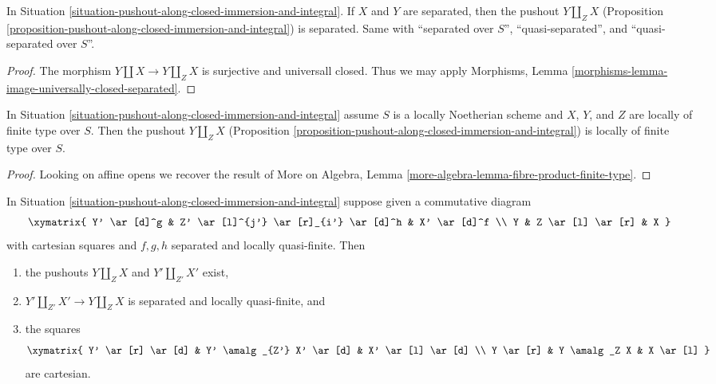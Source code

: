 \begin{lemma}
\label{lemma-pushout-separated}
In Situation \ref{situation-pushout-along-closed-immersion-and-integral}.
If $X$ and $Y$ are separated, then the pushout $Y \amalg_Z X$
(Proposition \ref{proposition-pushout-along-closed-immersion-and-integral})
is separated. Same with ``separated over $S$'', ``quasi-separated'', and
``quasi-separated over $S$''.
\end{lemma}

\begin{proof}
The morphism $Y \amalg X \to Y \amalg_Z X$ is surjective
and universall closed. Thus we may apply
Morphisms, Lemma \ref{morphisms-lemma-image-universally-closed-separated}.
\end{proof}

\begin{lemma}
\label{lemma-pushout-finite-type}
In Situation \ref{situation-pushout-along-closed-immersion-and-integral}
assume $S$ is a locally Noetherian scheme and $X$, $Y$, and $Z$
are locally of finite type over $S$. Then the pushout $Y \amalg_Z X$
(Proposition \ref{proposition-pushout-along-closed-immersion-and-integral})
is locally of finite type over $S$.
\end{lemma}

\begin{proof}
Looking on affine opens we recover the result of
More on Algebra, Lemma \ref{more-algebra-lemma-fibre-product-finite-type}.
\end{proof}

\begin{lemma}
\label{lemma-pushout-functor}
In Situation \ref{situation-pushout-along-closed-immersion-and-integral}
suppose given a commutative diagram
$$
\xymatrix{
Y' \ar[d]^g & Z' \ar[l]^{j'} \ar[r]_{i'} \ar[d]^h & X' \ar[d]^f \\
Y & Z \ar[l] \ar[r] & X
}
$$
with cartesian squares and $f, g, h$ separated and locally quasi-finite. Then
\begin{enumerate}
\item the pushouts $Y \amalg_Z X$ and $Y' \amalg_{Z'} X'$ exist,
\item $Y' \amalg_{Z'} X' \to Y \amalg_Z X$ is
separated and locally quasi-finite, and
\item the squares
$$
\xymatrix{
Y' \ar[r] \ar[d] & Y' \amalg_{Z'} X' \ar[d] & X' \ar[l] \ar[d] \\
Y \ar[r] & Y \amalg_Z X & X \ar[l]
}
$$
are cartesian.
\end{enumerate}
\end{lemma}

